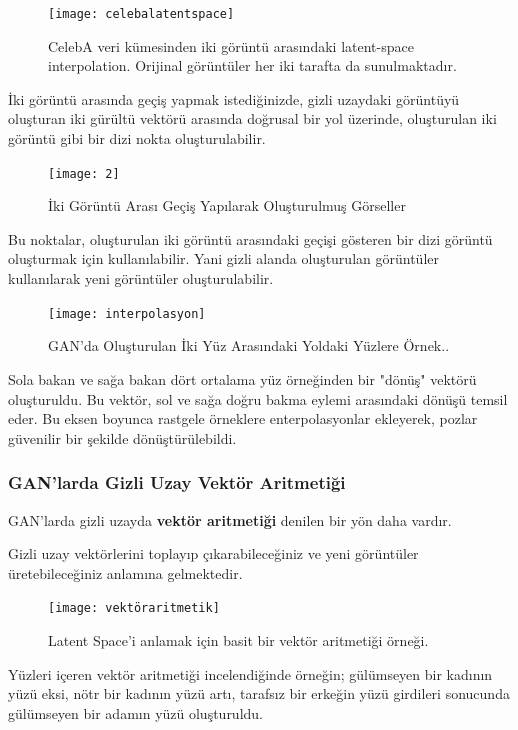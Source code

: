 \documentclass[12pt, a4paper]{article}
\begin{document}
	\begin{figure}[h]
		\centering
		\texttt{[image: celebalatentspace]}
		\label{celebalatentspace}
		\caption{CelebA veri kümesinden iki görüntü arasındaki latent-space interpolation. Orijinal görüntüler her iki tarafta da sunulmaktadır\cite{AutoEncoder-2024-04-04}.}
	\end{figure}
	\FloatBarrier
	İki görüntü arasında geçiş yapmak istediğinizde, gizli uzaydaki görüntüyü oluşturan iki gürültü vektörü arasında doğrusal bir yol üzerinde, oluşturulan iki görüntü gibi bir dizi nokta oluşturulabilir. 
	
	\begin{figure}[h]
		\centering
		\texttt{[image: 2]}
		\label{2}
		\caption{İki Görüntü Arası Geçiş Yapılarak Oluşturulmuş Görseller\cite{ganlatent}}
	\end{figure}
	\FloatBarrier
	Bu noktalar, oluşturulan iki görüntü arasındaki geçişi gösteren bir dizi görüntü oluşturmak için kullanılabilir. Yani gizli alanda oluşturulan görüntüler kullanılarak yeni görüntüler oluşturulabilir.
	
	\begin{figure}[h]
		\centering
		\texttt{[image: interpolasyon]}
		\label{interpolasyon}
		\caption{GAN'da Oluşturulan İki Yüz Arasındaki Yoldaki Yüzlere Örnek.\cite{radford2015unsupervised}.}
	\end{figure}
	\FloatBarrier
	Sola bakan ve sağa bakan dört ortalama yüz örneğinden bir "dönüş" vektörü oluşturuldu. Bu vektör, sol ve sağa doğru bakma eylemi arasındaki dönüşü temsil eder. Bu eksen boyunca rastgele örneklere enterpolasyonlar ekleyerek, pozlar güvenilir bir şekilde dönüştürülebildi\cite{radford2015unsupervised}.
	
	\subsubsection{GAN'larda Gizli Uzay Vektör Aritmetiği}
	
	GAN'larda gizli uzayda\textbf{ vektör aritmetiği} denilen bir yön daha vardır. 
	
	Gizli uzay vektörlerini toplayıp çıkarabileceğiniz ve yeni görüntüler üretebileceğiniz anlamına gelmektedir.
	
	\begin{figure}[h]
		\centering
		\texttt{[image: vektöraritmetik]}
		\label{vektöraritmetik}
		\caption{Latent Space'i anlamak için basit bir vektör aritmetiği örneği\cite{GAN-2024-04-02}.}
	\end{figure}
	\FloatBarrier
	\clearpage
	Yüzleri içeren vektör aritmetiği incelendiğinde örneğin; gülümseyen bir kadının yüzü eksi, nötr bir kadının yüzü artı, tarafsız bir erkeğin yüzü girdileri sonucunda gülümseyen bir adamın yüzü oluşturuldu.
	
\end{document}
